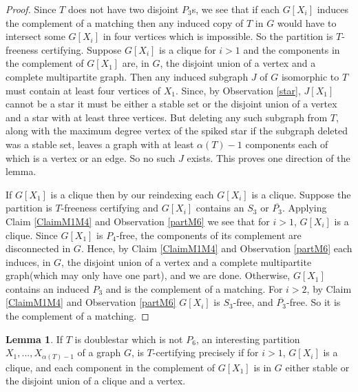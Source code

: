 \documentclass[12pt]{article}
\theoremstyle{definition}
\newtheorem{lemma}[theorem]{Lemma}
\begin{document}
\begin{proof}
Since $T$ does not have two disjoint $P_3$s, we see that if each $G[X_i]$ induces the complement of a matching
then any induced copy of $T$ in $G$ would have to intersect some $G[X_i]$ in four vertices which is impossible. 
So the partition is $T$-freeness certifying. 
Suppose $G[X_i]$ is a clique for $i>1$ and the components in the complement of   $G[X_1]$ are, in $G$,  the disjoint 
union of a vertex and a complete multipartite graph.  Then any induced subgraph $J$  of $G$
isomorphic to $T$ must contain  at least four vertices of $X_1$. Since, by Observation \ref{star}, $J[X_1]$ cannot be a star it must 
be either a stable set or  the disjoint union of a vertex and  a star with at least three vertices.  
But deleting any such subgraph from $T$, along with the maximum degree vertex of the spiked  star if the subgraph deleted was a stable set, leaves 
a graph with at least $\alpha(T)-1$ components each of which is a vertex or an edge. So no such $J$ exists. This proves one direction of the lemma. 

If $G[X_1]$ is a clique then by our reindexing each $G[X_i]$ is a clique. 
Suppose the partition is $T$-freeness certifying and $G[X_i]$ contains  an $S_3$ or $\overline{P_3}$. 
Applying Claim \ref{ClaimM1M4} and Observation \ref{partM6} we see that for $i>1$, $G[X_i]$ is a clique. 
Since $G[X_1]$ is $P_4$-free, the components of its complement are disconnected in $G$. Hence, by Claim \ref{ClaimM1M4} and Observation \ref{partM6} each induces, in $G$,  the disjoint union
of a  vertex and a complete multipartite graph(which may only have one part), and we are done. Otherwise, $G[X_1]$ contains an induced $P_3$ and
 is the complement of a matching.  For $i>2$,   by Claim \ref{ClaimM1M4} and Observation \ref{partM6} 
 $G[X_i]$ is $S_3$-free, and $\overline{P_3}$-free. So it is the complement of a matching. 
\end{proof}


\begin{lemma} \label{doubles}
 If $T$ is  doublestar which is not $P_6$, an interesting  partition $X_1,...,X_{\alpha(T)-1}$  of a graph $G$, is $T$-certifying 
precisely if   for $i>1$, $G[X_i]$ is a clique, and each  component in the 
complement of $G[X_1]$  is in $G$   either stable  or the    disjoint union of a clique and a vertex. 
\end{lemma}
\end{document}
